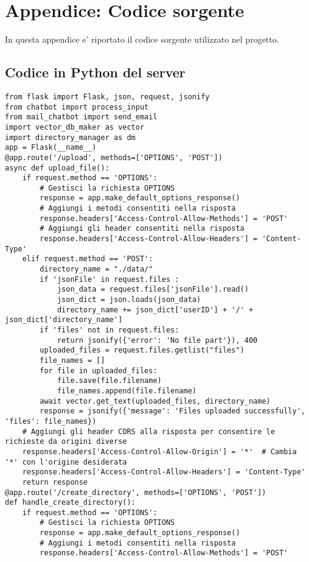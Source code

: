 \chapter{Appendice: Codice sorgente}
In questa appendice e' riportato il codice sorgente utilizzato nel progetto.
\section{Codice in Python del server}
\begin{lstlisting}[style=pythonstyle,caption={Codice del server.py}, label={lst:server}]
from flask import Flask, json, request, jsonify
from chatbot import process_input
from mail_chatbot import send_email
import vector_db_maker as vector
import directory_manager as dm
app = Flask(__name__)
@app.route('/upload', methods=['OPTIONS', 'POST'])
async def upload_file():
    if request.method == 'OPTIONS':
        # Gestisci la richiesta OPTIONS
        response = app.make_default_options_response()
        # Aggiungi i metodi consentiti nella risposta
        response.headers['Access-Control-Allow-Methods'] = 'POST'
        # Aggiungi gli header consentiti nella risposta
        response.headers['Access-Control-Allow-Headers'] = 'Content-Type'
    elif request.method == 'POST':
        directory_name = "./data/"
        if 'jsonFile' in request.files :
            json_data = request.files['jsonFile'].read()
            json_dict = json.loads(json_data)
            directory_name += json_dict['userID'] + '/' + json_dict['directory_name']
        if 'files' not in request.files:
            return jsonify({'error': 'No file part'}), 400
        uploaded_files = request.files.getlist("files")
        file_names = []
        for file in uploaded_files:
            file.save(file.filename)
            file_names.append(file.filename)
        await vector.get_text(uploaded_files, directory_name)
        response = jsonify({'message': 'Files uploaded successfully', 'files': file_names})
    # Aggiungi gli header CORS alla risposta per consentire le richieste da origini diverse
    response.headers['Access-Control-Allow-Origin'] = '*'  # Cambia '*' con l'origine desiderata
    response.headers['Access-Control-Allow-Headers'] = 'Content-Type'
    return response
@app.route('/create_directory', methods=['OPTIONS', 'POST'])
def handle_create_directory():
    if request.method == 'OPTIONS':
        # Gestisci la richiesta OPTIONS
        response = app.make_default_options_response()
        # Aggiungi i metodi consentiti nella risposta
        response.headers['Access-Control-Allow-Methods'] = 'POST'

\end{lstlisting}
